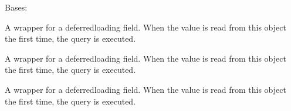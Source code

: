 \documentclass[letterpaper,10pt,spanish]{sphinxmanual}
\begin{document}
\begin{fulllineitems}
\begin{fulllineitems}
\label{\detokenize{modules/appusuarios:appusuarios.models.Usuario.MultipleObjectsReturned}}
\pysigstartsignatures
{}
\pysigstopsignatures
\sphinxAtStartPar
Bases: 

\end{fulllineitems}


\begin{fulllineitems}
\label{\detokenize{modules/appusuarios:appusuarios.models.Usuario.curso}}
\pysigstartsignatures
{}
\pysigstopsignatures
\sphinxAtStartPar
A wrapper for a deferred\sphinxhyphen{}loading field. When the value is read from this
object the first time, the query is executed.

\end{fulllineitems}


\begin{fulllineitems}
\label{\detokenize{modules/appusuarios:appusuarios.models.Usuario.email}}
\pysigstartsignatures
{}
\pysigstopsignatures
\sphinxAtStartPar
A wrapper for a deferred\sphinxhyphen{}loading field. When the value is read from this
object the first time, the query is executed.

\end{fulllineitems}


\begin{fulllineitems}
\label{\detokenize{modules/appusuarios:appusuarios.models.Usuario.nombre_usuario}}
\pysigstartsignatures
{}
\pysigstopsignatures
\sphinxAtStartPar
A wrapper for a deferred\sphinxhyphen{}loading field. When the value is read from this
object the first time, the query is executed.

\end{fulllineitems}


\end{fulllineitems}
\end{document}
